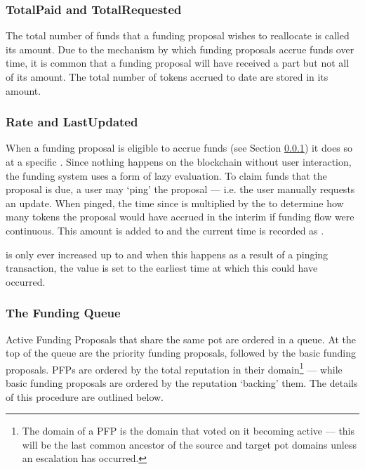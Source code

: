 \subsubsection*{TotalPaid and TotalRequested}
The total number of funds that a funding proposal wishes to reallocate is called its  amount. Due to the mechanism by which funding proposals accrue funds over time, it is common that a funding proposal will have received a part but not all of its  amount. The total number of tokens accrued to date are stored in its  amount. 

\subsubsection*{Rate and LastUpdated}
When a funding proposal is eligible to accrue funds (see Section \ref{subsec:funding-queue}) it does so at a specific . Since nothing happens on the blockchain without user interaction, the funding system uses a form of lazy evaluation. To claim funds that the proposal is due, a user may `ping' the proposal --- i.e. the user manually requests an update. When pinged, the time since  is multiplied by the  to determine how many tokens the proposal would have accrued in the interim if funding flow were continuous. This amount is added to  and the current time is recorded as .

 is only ever increased up to  and when this happens as a result of a pinging transaction, the  value is set to the earliest time at which this could have occurred.

\subsubsection{The Funding Queue}\label{subsec:funding-queue}
Active Funding Proposals that share the same  pot are ordered in a queue. At the top of the queue are the priority funding proposals, followed by the basic funding proposals. PFPs are ordered by the total reputation in their domain\footnote{The domain of a PFP is the domain that voted on it becoming active --- this will be the last common ancestor of the source and target pot domains unless an escalation has occurred.} --- while basic funding proposals are ordered by the reputation `backing' them.  The details of this procedure are outlined below.

